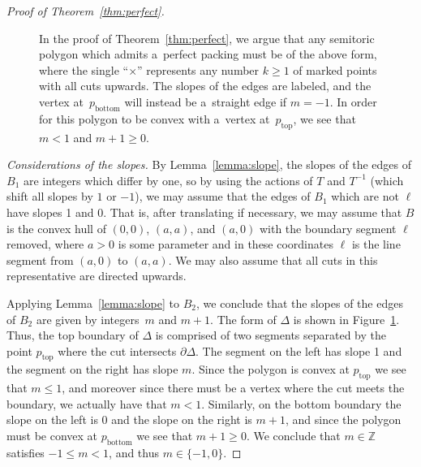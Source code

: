 \documentclass[10pt,a4paper]{amsart}
\numberwithin{equation}{section}
\newcommand{\triangleline}{dashed}
\def\Z{{\mathbb Z}}
\newcommand{\De}{\Delta}
\theoremstyle{definition}
\theoremstyle{plain}
\theoremstyle{plain}
\begin{document}
\begin{proof}[Proof of Theorem~\ref{thm:perfect}]
\begin{figure}[t]
 \centering
 \caption{In the proof of Theorem~\ref{thm:perfect}, we argue that any semitoric polygon which admits a~perfect packing must be of the above form, where the single ``$\times$'' represents any number $k\geq 1$ of marked points with all cuts upwards. The slopes of the edges are labeled, and the vertex at~$p_{\text{bottom}}$ will instead be a~straight edge if $m=-1$.
 In order for this polygon to be convex with a~vertex at~$p_{\text{top}}$, we see that $m<1$ and $m+1\geq 0$.}
 \label{fig:slopes}
\end{figure}

{\it Considerations of the slopes.}
By Lemma~\ref{lemma:slope}, the slopes of the edges of $B_1$ are integers which differ by one, so by using the actions of $T$ and $T^{-1}$ (which shift all slopes by $1$ or $-1$), we may assume that the edges of $B_1$ which are not $\ell$ have slopes 1 and 0. That is, after translating if necessary, we may assume that $B$ is the convex hull of $(0,0)$, $(a,a)$, and $(a,0)$ with the boundary segment $\ell$ removed, where $a>0$ is some parameter and in these coordinates $\ell$ is the line segment from $(a,0)$ to $(a,a)$.
We may also assume that all cuts in this representative are directed upwards.

Applying Lemma~\ref{lemma:slope} to $B_2$, we conclude that the slopes of the edges of $B_2$ are given by integers~$m$ and $m+1$.
The form of $\De$ is shown in Figure~\ref{fig:slopes}.
Thus, the top boundary of $\De$ is comprised of two segments separated by the point $p_{\text{top}}$ where the cut intersects $\partial \De$.
The segment on the left has slope 1 and the segment on the right has slope $m$.
Since the polygon is convex at $p_{\text{top}}$ we see that $m\leq 1$, and moreover since there must be a vertex where the cut meets the boundary, we actually have that $m<1$.
Similarly, on the bottom boundary the slope on the left is 0 and the slope on the right is $m+1$, and since the polygon must be convex at $p_{\text{bottom}}$ we see that $m+1\geq 0$.
We conclude that $m\in\Z$ satisfies $-1\leq m < 1$, and thus $m\in\{-1,0\}$.


\end{proof}
\end{document}
